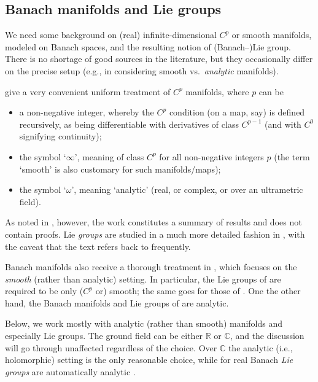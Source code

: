 \documentclass[11pt]{article}
\numberwithin{equation}{section}
\numberwithin{equation}{section}
\newcommand\bC{{\mathbb C}}
\newcommand\bR{{\mathbb R}}
\begin{document}
\subsection{Banach manifolds and Lie groups}\label{subse:banmf}

We need some background on (real) infinite-dimensional $C^p$ or smooth manifolds, modeled on Banach spaces, and the resulting notion of (Banach--)Lie group. There is no shortage of good sources in the literature, but they occasionally differ on the precise setup (e.g., in considering smooth vs.\ {\it analytic} manifolds).

\cite{bourb-vars-17,bourb-vars-8-15} give a very convenient uniform treatment of $C^p$ manifolds, where $p$ can be
\begin{itemize}\itemsep=0pt
\item a non-negative integer, whereby the $C^p$ condition (on a map, say) is defined recursively, as being differentiable with derivatives of class $C^{p-1}$ (and with $C^0$ signifying continuity);

\item the symbol `$\infty$', meaning of class $C^p$ for all non-negative integers $p$ (the term `smooth' is also customary for such manifolds/maps);

\item the symbol `$\omega$', meaning `analytic' (real, or complex, or over an ultrametric field).
\end{itemize}
As noted in \cite[Avertissement]{bourb-vars-17}, however, the work constitutes a summary of results and does not contain proofs. Lie {\it groups} are studied in a much more detailed fashion in \cite[Chapter III]{bourb-lie-13}, with the caveat that the text refers back to \cite{bourb-vars-17,bourb-vars-8-15} frequently.

Banach manifolds also receive a thorough treatment in \cite{lang-fund}, which focuses on the {\it smooth} (rather than analytic) setting. In particular, the Lie groups of \cite[Section~VI.5]{lang-fund} are required to be only ($C^p$ or) smooth; the same goes for those of \cite[Definition IV.1]{neeb-inf}. One the other hand, the Banach manifolds \cite[Section~3]{upm-ban} and Lie groups of \cite[Section~6]{upm-ban} are analytic.

Below, we work mostly with analytic (rather than smooth) manifolds and especially Lie groups. The ground field can be either $\bR$ or $\bC$, and the discussion will go through unaffected regardless of the choice. Over $\bC$ the analytic (i.e., holomorphic) setting is the only reasonable choice, while for real Banach {\it Lie groups} are automatically analytic \cite[Corollary IV.1.10]{neeb-lc}.
\end{document}
